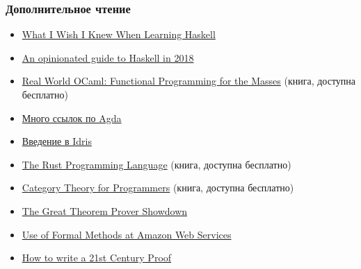 \documentclass[11pt]{beamer}
\begin{document}
\begin{frame}[fragile]
  \frametitle{Дополнительное чтение}
  \begin{itemize}
    \item \href{http://dev.stephendiehl.com/hask/}{What I Wish I Knew When Learning Haskell}
    \item \href{https://lexi-lambda.github.io/blog/2018/02/10/an-opinionated-guide-to-haskell-in-2018/}{An opinionated guide to Haskell in 2018}
    \item \href{https://realworldocaml.org/}{Real World OCaml: Functional Programming for the Masses} (книга, доступна бесплатно)
    \item \href{https://wiki.portal.chalmers.se/agda/pmwiki.php?n=Main.Documentation}{Много ссылок по Agda}
    \item \href{http://docs.idris-lang.org/en/latest/tutorial/index.html}{Введение в Idris}
    \item \href{https://doc.rust-lang.org/1.30.0/book/2018-edition/index.html}{The Rust Programming Language} (книга, доступна бесплатно)
    \item \href{https://github.com/hmemcpy/milewski-ctfp-pdf}{Category Theory for Programmers} (книга, доступна бесплатно)
    \item \href{https://www.hillelwayne.com/post/theorem-prover-showdown/}{The Great Theorem Prover Showdown}
    \item \href{https://blog.acolyer.org/2014/11/24/use-of-formal-methods-at-amazon-web-services/}{Use of Formal Methods at Amazon Web Services}
    \item \href{https://blog.acolyer.org/2015/01/12/how-to-write-a-21st-century-proof/}{How to write a 21st Century Proof}
  \end{itemize}
\end{frame}
\end{document}
